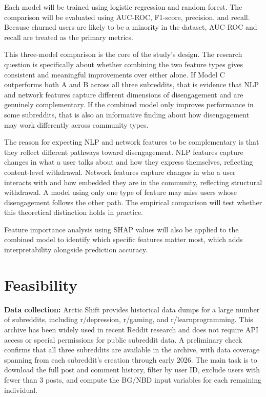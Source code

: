 \documentclass[12pt]{article}
\begin{document}
Each model will be trained using logistic regression and random forest. The comparison will be evaluated using AUC-ROC, F1-score, precision, and recall. Because churned users are likely to be a minority in the dataset, AUC-ROC and recall are treated as the primary metrics.

This three-model comparison is the core of the study's design. The research question is specifically about whether combining the two feature types gives consistent and meaningful improvements over either alone. If Model C outperforms both A and B across all three subreddits, that is evidence that NLP and network features capture different dimensions of disengagement and are genuinely complementary. If the combined model only improves performance in some subreddits, that is also an informative finding about how disengagement may work differently across community types.

The reason for expecting NLP and network features to be complementary is that they reflect different pathways toward disengagement. NLP features capture changes in what a user talks about and how they express themselves, reflecting content-level withdrawal. Network features capture changes in who a user interacts with and how embedded they are in the community, reflecting structural withdrawal. A model using only one type of feature may miss users whose disengagement follows the other path. The empirical comparison will test whether this theoretical distinction holds in practice.

Feature importance analysis using SHAP values will also be applied to the combined model to identify which specific features matter most, which adds interpretability alongside prediction accuracy.

\section*{Feasibility}

\textbf{Data collection:} Arctic Shift provides historical data dumps for a large number of subreddits, including r/depression, r/gaming, and r/learnprogramming. This archive has been widely used in recent Reddit research and does not require API access or special permissions for public subreddit data. A preliminary check confirms that all three subreddits are available in the archive, with data coverage spanning from each subreddit's creation through early 2026. The main task is to download the full post and comment history, filter by user ID, exclude users with fewer than 3 posts, and compute the BG/NBD input variables for each remaining individual.
\end{document}
